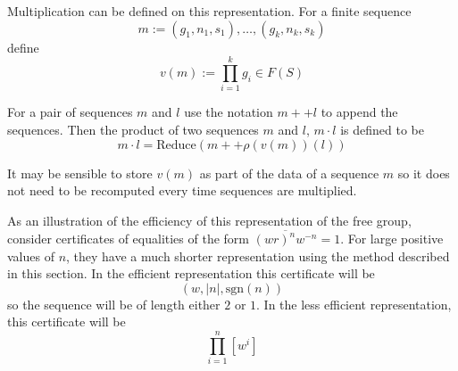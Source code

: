 \documentclass[12pt]{article} %
\theoremstyle{definition}
\theoremstyle{definition}
\theoremstyle{definition}
\theoremstyle{definition}
\begin{document}


Multiplication can be defined on this representation.
For a finite sequence
\begin{equation}
  m := (g_1, n_1, s_1), \dots, (g_k, n_k, s_k)
\end{equation}
define
\begin{equation}
  v(m) := \prod_{i=1}^k g_i \in F(S)
\end{equation}

For a pair of sequences $m$ and $l$ use the notation $m ++ l$ to append the sequences.
Then the product of two sequences $m$ and $l$, $m \cdot l$ is defined to be
\begin{equation}
  m \cdot l = \text{Reduce}(m ++ \rho(v(m))(l))
\end{equation}

It may be sensible to store $v(m)$ as part of the data of a sequence $m$ so it does not
need to be recomputed every time sequences are multiplied.

As an illustration of the efficiency of this
representation of the free group, consider certificates of equalities
of the form $\overline{(wr)^n w^{-n}} = 1$. For
large positive values of $n$, they
have a much shorter representation using the method described in this section.
In the efficient representation this certificate will be
\begin{equation}
  (w, |n|, \text{sgn}(n))
\end{equation}
so the sequence
will be of length either $2$ or $1$. In the less efficient representation,
this certificate will be
\begin{equation}
  \prod_{i=1}^n [w^i]
\end{equation}
\end{document}

